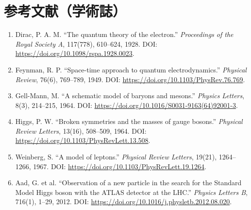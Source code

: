 \section*{参考文献（学術誌）}
\begin{enumerate}[leftmargin=2.4em]
\item Dirac, P. A. M. ``The quantum theory of the electron.'' \textit{Proceedings of the Royal Society A}, 117(778), 610--624, 1928. DOI: \url{https://doi.org/10.1098/rspa.1928.0023}.
\item Feynman, R. P. ``Space-time approach to quantum electrodynamics.'' \textit{Physical Review}, 76(6), 769--789, 1949. DOI: \url{https://doi.org/10.1103/PhysRev.76.769}.
\item Gell-Mann, M. ``A schematic model of baryons and mesons.'' \textit{Physics Letters}, 8(3), 214--215, 1964. DOI: \url{https://doi.org/10.1016/S0031-9163(64)92001-3}.
\item Higgs, P. W. ``Broken symmetries and the masses of gauge bosons.'' \textit{Physical Review Letters}, 13(16), 508--509, 1964. DOI: \url{https://doi.org/10.1103/PhysRevLett.13.508}.
\item Weinberg, S. ``A model of leptons.'' \textit{Physical Review Letters}, 19(21), 1264--1266, 1967. DOI: \url{https://doi.org/10.1103/PhysRevLett.19.1264}.
\item Aad, G. et al. ``Observation of a new particle in the search for the Standard Model Higgs boson with the ATLAS detector at the LHC.'' \textit{Physics Letters B}, 716(1), 1--29, 2012. DOI: \url{https://doi.org/10.1016/j.physletb.2012.08.020}.
\end{enumerate}
